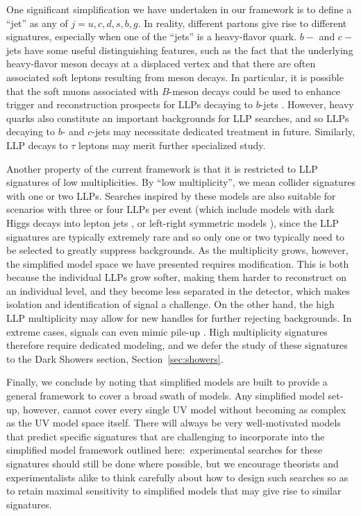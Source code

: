 One significant simplification we have undertaken in our framework is to define a ``jet'' as any of $j=u,c,d,s,b,g$. In reality, different partons give rise to different signatures, especially when one of the ``jets'' is a heavy-flavor quark. $b-$ and $c-$jets have some useful distinguishing features, such as the fact that the underlying heavy-flavor meson decays at a displaced vertex and that there are often associated soft leptons resulting from meson decays. In particular, it is possible that the soft muons associated with $B$-meson decays could be used to enhance trigger and reconstruction prospects for LLPs decaying to $b$-jets \cite{Aad:2013txa}. However, heavy quarks also constitute an important backgrounds for LLP searches, and so LLPs decaying to $b$- and $c$-jets may necessitate dedicated treatment in future. Similarly, LLP decays to $\tau$ leptons may merit further specialized study.

Another property of the current framework is that it is restricted to LLP signatures of low multiplicities. By ``low multiplicity'', we mean collider signatures with one or two LLPs. Searches inspired by these models are also suitable for scenarios with three or four LLPs per event (which include models with dark Higgs decays into lepton jets \cite{Falkowski:2010cm}, or left-right symmetric models \cite{Nemevsek:2016enw}), since the LLP signatures are typically extremely rare and so only one or two typically need to be selected to greatly suppress backgrounds. As the multiplicity grows, however, the simplified model space we have presented requires modification. This is both because the individual LLPs grow softer, making them harder to reconstruct on an individual level, and they become less separated in the detector, which makes isolation and identification of signal a challenge. On the other hand, the high LLP multiplicity may allow for new handles for further rejecting backgrounds. In extreme cases, signals can even mimic pile-up \cite{Knapen:2016hky}. High multiplicity signatures therefore require dedicated modeling, and we defer the study of these signatures to the Dark Showers section, Section~\ref{sec:showers}.

Finally, we conclude by noting that simplified models are built to provide a general framework to cover a broad swath of models. Any simplified model set-up, however, cannot cover every single UV model without becoming as complex as the UV model space itself. There will always be very well-motivated models that predict specific signatures that are challenging to incorporate into the simplified model framework outlined here:~experimental searches for these signatures should still be done where possible, but we encourage theorists and experimentalists alike to think carefully about how to design such searches so as to retain maximal sensitivity to simplified models that may give rise to similar signatures.
